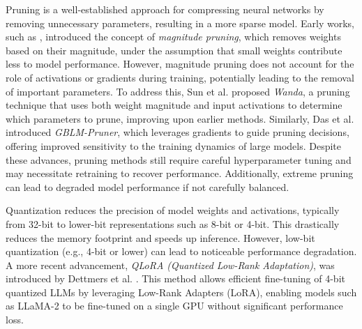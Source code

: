 
Pruning is a well-established approach for compressing neural networks by removing unnecessary parameters, resulting in a more sparse model. Early works, such as \cite{han2015deepcompression}, introduced the concept of \textit{magnitude pruning}, which removes weights based on their magnitude, under the assumption that small weights contribute less to model performance. However, magnitude pruning does not account for the role of activations or gradients during training, potentially leading to the removal of important parameters. To address this, Sun et al. \cite{sun2023pruningllm} proposed \textit{Wanda}, a pruning technique that uses both weight magnitude and input activations to determine which parameters to prune, improving upon earlier methods. Similarly, Das et al. \cite{das2023beyondsize} introduced \textit{GBLM-Pruner}, which leverages gradients to guide pruning decisions, offering improved sensitivity to the training dynamics of large models. Despite these advances, pruning methods still require careful hyperparameter tuning and may necessitate retraining to recover performance. Additionally, extreme pruning can lead to degraded model performance if not carefully balanced.


Quantization reduces the precision of model weights and activations, typically from 32-bit to lower-bit representations such as 8-bit or 4-bit. This drastically reduces the memory footprint and speeds up inference. However, low-bit quantization (e.g., 4-bit or lower) can lead to noticeable performance degradation. A more recent advancement, \textit{QLoRA (Quantized Low-Rank Adaptation)}, was introduced by Dettmers et al. \cite{dettmers2024qlora}. This method allows efficient fine-tuning of 4-bit quantized LLMs by leveraging Low-Rank Adapters (LoRA), enabling models such as LLaMA-2 to be fine-tuned on a single GPU without significant performance loss.


